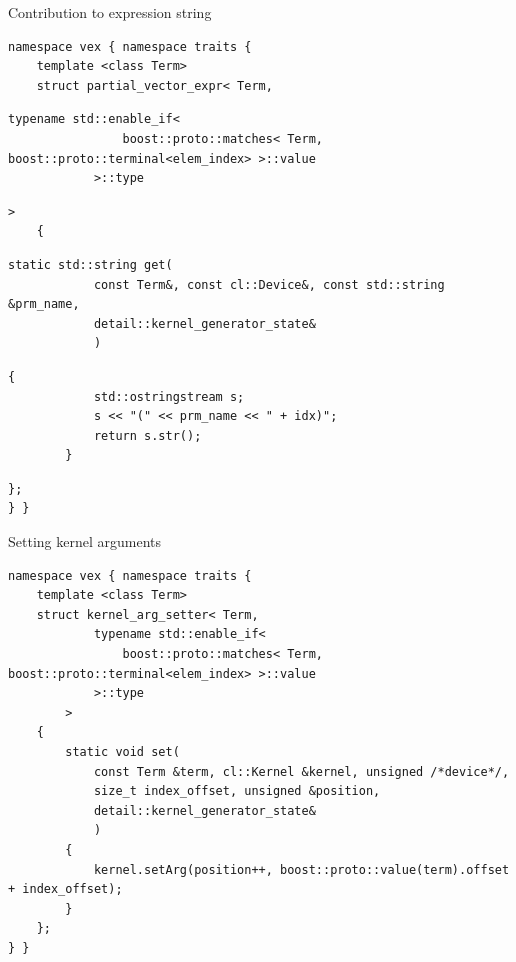 \documentclass[@BEAMER_OPTIONS@]{beamer}
\begin{document}
\begin{frame}[fragile]{Contribution to expression string}
    \begin{exampleblock}{}
            \begin{lstlisting}
namespace vex { namespace traits {
    template <class Term>
    struct partial_vector_expr< Term,
            \end{lstlisting}
            \begin{lstlisting}[firstnumber=last]
            typename std::enable_if<
                boost::proto::matches< Term, boost::proto::terminal<elem_index> >::value
            >::type
            \end{lstlisting}
            \begin{lstlisting}[firstnumber=last]
        >
    {
            \end{lstlisting}
            \begin{lstlisting}[firstnumber=last]
        static std::string get(
            const Term&, const cl::Device&, const std::string &prm_name,
            detail::kernel_generator_state&
            )
            \end{lstlisting}
            \begin{lstlisting}[firstnumber=last]
        {
            std::ostringstream s;
            s << "(" << prm_name << " + idx)";
            return s.str();
        }
            \end{lstlisting}
            \begin{lstlisting}[firstnumber=last]
    };
} }
            \end{lstlisting}
    \end{exampleblock}
\end{frame}

\begin{frame}[fragile]{Setting kernel arguments}
    \begin{exampleblock}{}
        \begin{lstlisting}
namespace vex { namespace traits {
    template <class Term>
    struct kernel_arg_setter< Term,
            typename std::enable_if<
                boost::proto::matches< Term, boost::proto::terminal<elem_index> >::value
            >::type
        >
    {
        static void set(
            const Term &term, cl::Kernel &kernel, unsigned /*device*/,
            size_t index_offset, unsigned &position,
            detail::kernel_generator_state&
            )
        {
            kernel.setArg(position++, boost::proto::value(term).offset + index_offset);
        }
    };
} }
        \end{lstlisting}
    \end{exampleblock}
\end{frame}

\begin{frame}
    \begin{center}
        \begin{Huge}
            \color{chameleon1}{Questions?}
        \end{Huge}
    \end{center}
\end{frame}
\end{document}
